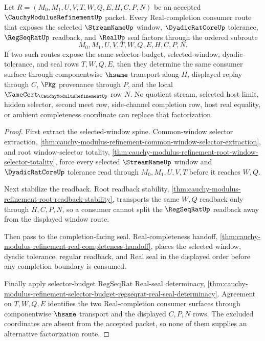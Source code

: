 \begin{theorem}
\label{thm:cauchy-modulus-refinement-window-route-factorization}
Let $R=(M_0,M_1,U,V,T,W,Q,E,H,C,P,N)$ be an accepted $\CauchyModulusRefinementUp$ packet. Every Real-completion consumer route that exposes the selected $\StreamNameUp$ window, $\DyadicRatCoreUp$ tolerance, $\RegSeqRatUp$ readback, and $\RealUp$ seal factors through the ordered subroute
$$
M_0,M_1,U,V,T,W,Q,E,H,C,P,N.
$$
If two such routes expose the same selector-budget, selected-window, dyadic-tolerance, and seal rows $T,W,Q,E$, then they determine the same consumer surface through componentwise $\hsame$ transport along $H$, displayed replay through $C$, $\Pkg$ provenance through $P$, and the local $\NameCert_{\CauchyModulusRefinementUp}$ row $N$. No quotient stream, selected host limit, hidden selector, second meet row, side-channel completion row, host real equality, or ambient completeness coordinate can replace that factorization.
\end{theorem}
\begin{proof}
First extract the selected-window spine. Common-window selector extraction, \autoref{thm:cauchy-modulus-refinement-common-window-selector-extraction}, and root window-selector totality, \autoref{thm:cauchy-modulus-refinement-root-window-selector-totality}, force every selected $\StreamNameUp$ window and $\DyadicRatCoreUp$ tolerance read through $M_0,M_1,U,V,T$ before it reaches $W,Q$.

Next stabilize the readback. Root readback stability, \autoref{thm:cauchy-modulus-refinement-root-readback-stability}, transports the same $W,Q$ readback only through $H,C,P,N$, so a consumer cannot split the $\RegSeqRatUp$ readback away from the displayed window route.

Then pass to the completion-facing seal. Real-completeness handoff, \autoref{thm:cauchy-modulus-refinement-real-completeness-handoff}, places the selected window, dyadic tolerance, regular readback, and Real seal in the displayed order before any completion boundary is consumed.

Finally apply selector-budget RegSeqRat Real-seal determinacy, \autoref{thm:cauchy-modulus-refinement-selector-budget-regseqrat-real-seal-determinacy}. Agreement on $T,W,Q,E$ identifies the two Real-completion consumer surfaces through componentwise $\hsame$ transport and the displayed $C,P,N$ rows. The excluded coordinates are absent from the accepted packet, so none of them supplies an alternative factorization route.
\end{proof}

